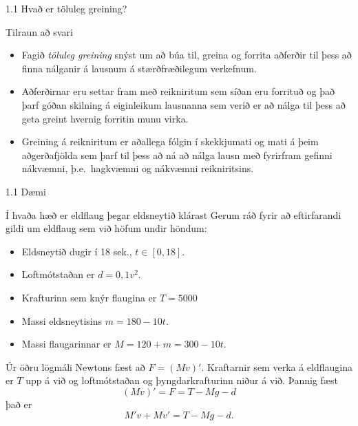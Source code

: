 \begin{frame}{1.1 Hvað er töluleg greining?} \pause
\smallskip
\begin{block}{Tilraun að svari} 
\begin{itemize} 
\item Fagið {\it töluleg greining} snýst um að búa til, greina og forrita
aðferðir til þess  að finna nálganir á lausnum á stærðfræðilegum
verkefnum.\pause
\item  Aðferðirnar eru settar fram með reikniritum sem síðan eru
forrituð og það  þarf góðan skilning á eiginleikum lausnanna sem verið
er að nálga til þess að geta greint hvernig forritin munu virka.\pause
\item Greining á reikniritum er aðallega fólgin í skekkjumati og
mati á þeim aðgerðafjölda sem þarf til þess að ná að nálga lausn með
fyrirfram gefinni nákvæmni, \pause þ.e.~hagkvæmni og nákvæmni reikniritsins.
\end{itemize} 
\end{block}
\end{frame}

\begin{frame}{1.1 Dæmi}
 \begin{block}{Í hvaða hæð er eldflaug þegar eldsneytið klárast}
Gerum ráð fyrir að eftirfarandi gildi um eldflaug sem við höfum undir höndum:
\begin{itemize}
 \item Eldsneytið dugir í 18 sek., $t\in [0,18]$.
\item Loftmótstaðan er $d=0,1v^2$.
\item Krafturinn sem knýr flaugina er $T=5000$
\item Massi eldsneytisins $m=180-10t$.
\item Massi flaugarinnar er $M = 120 + m = 300 - 10t$.
\end{itemize}
\pause

Úr öðru lögmáli Newtons fæst að $F = (Mv)'$. \pause
Kraftarnir sem verka á eldflaugina er $T$ upp á við og 
loftmótstaðan og þyngdarkrafturinn niður á við. Þannig fæst
$$
  (Mv)' = F = T - Mg - d
$$\pause
það er
$$
M'v + Mv' = T - Mg -d.
$$
\end{block}
\end{frame}

